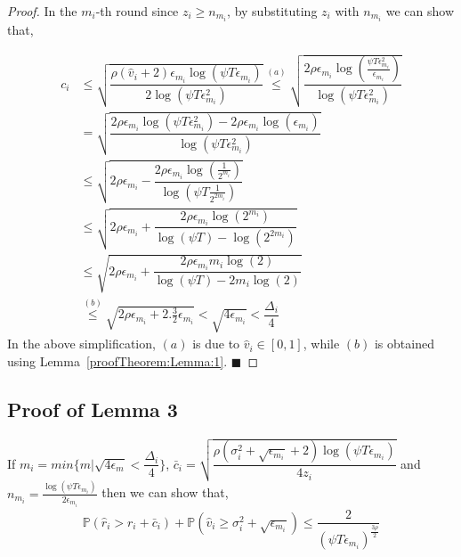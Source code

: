 \begin{proof}

	In the $m_i$-th round since $z_i\geq n_{m_i}$, by substituting $z_i$ with $n_{m_i}$ we can show that, 

\begin{align*}
	c_{i} &\leq \sqrt{\dfrac{\rho (\hat{v}_i + 2)\epsilon_{m_{i}}\log (\psi T\epsilon_{m_{i}})}{2\log(\psi T\epsilon_{m_{i}}^{2})}} \overset{(a)}{\leq} \sqrt{\dfrac{2\rho\epsilon_{m_{i}}\log (\frac{\psi T\epsilon_{m_{i}}^{2}}{\epsilon_{m_{i}}})}{\log(\psi T\epsilon_{m_{i}}^{2})}} \\
	& = \sqrt{\dfrac{2\rho\epsilon_{m_{i}}\log (\psi T\epsilon_{m_{i}}^{2}) - 2\rho\epsilon_{m_{i}}\log (\epsilon_{m_{i}})}{\log(\psi T\epsilon_{m_{i}}^{2})}} \\
	& \leq  \sqrt{2\rho\epsilon_{m_{i}} - \dfrac{2\rho\epsilon_{m_i}\log(\frac{1}{2^{m_i}})}{\log(\psi T \frac{1}{2^{2m_i}})}} \\
	&\leq \sqrt{2\rho\epsilon_{m_{i}} + \dfrac{2\rho\epsilon_{m_i}\log(2^{m_i})}{\log(\psi T) - \log( 2^{2m_i})}}\\
	& \leq \sqrt{2\rho\epsilon_{m_{i}} + \dfrac{2\rho\epsilon_{m_i}m_i \log(2)}{\log(\psi T) - 2m_i\log( 2)}} \\ 
	 & \overset{(b)}{\leq} \sqrt{2\rho\epsilon_{m_{i}} + 2.\frac{3}{2}\epsilon_{m_i}} 
	  < \sqrt{4\epsilon_{m_i}} < \dfrac{\Delta_{i}}{4}
	\end{align*}
In the above simplification, $(a)$ is due to $\hat{v}_i \in [0,1]$, while $(b)$ is obtained using Lemma~\ref{proofTheorem:Lemma:1}.
\hfill $\blacksquare$	
\end{proof}


\subsection{Proof of Lemma 3}
\label{App:Lemma:3}
\begin{lemma}
If $m_i = min\lbrace m|\sqrt{4\epsilon_{m} } < \dfrac{\Delta_i}{4} \rbrace $,  $\bar{c}_i=\sqrt{\dfrac{\rho (\sigma_{i}^{2}+\sqrt{\epsilon_{m_{i}}} + 2)\log(\psi T\epsilon_{m_{i}})}{4z_i}}$ and $n_{m_i} = \frac{\log{(\psi T\epsilon_{m_{i}})}}{2\epsilon_{m_{i}}}$ then we can show that,
\begin{align*}
\mathbb{P}\left( \hat{r}_{i} > r_{i}+ \bar{c}_i\right) 
+ \mathbb{P}\left( \hat{v}_{i}\geq \sigma_{i}^{2}+\sqrt{\epsilon_{m_{i}}}\right) \leq \dfrac{2}{(\psi  T\epsilon_{m_{i}})^{\frac{3\rho}{2}}}
\end{align*}
\end{lemma}

